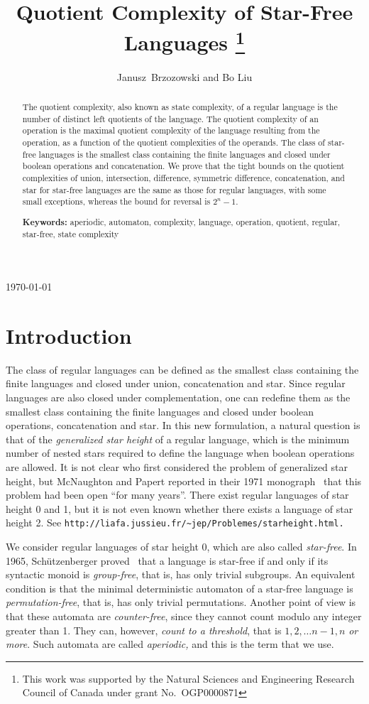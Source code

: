 \documentclass{llncs}
\title{Quotient Complexity of Star-Free Languages
\thanks{This work was supported by the Natural Sciences and Engineering Research Council of Canada under grant No.~OGP0000871
}
}
\author{Janusz~Brzozowski and Bo Liu
 }
\institute{David R. Cheriton School of Computer Science, University of Waterloo, \\
Waterloo, ON, Canada N2L 3G1\\
\{ {\tt brzozo, b23liu} \}{\tt @uwaterloo.ca} 
}
\newcommand{\noin}{\noindent}
\begin{document}
\maketitle
\today
\begin{abstract}
The quotient complexity, also known as state complexity, of a regular language is the number of distinct left quotients of the language.
The quotient complexity of an operation is the maximal quotient complexity of the language resulting from the operation, as a function of the quotient complexities of the operands.
The class of star-free languages is the smallest class  containing the  finite languages and closed under boolean operations and concatenation.
We prove that the tight bounds on the quotient complexities of union, intersection, difference,  symmetric difference, concatenation, and star  for star-free languages are the same as those for regular languages, with some small exceptions, whereas the bound for reversal is $2^n-1$.
\bigskip

\noin
{\bf Keywords:}
aperiodic, automaton,  complexity,  language,  operation, quotient, regular, star-free, state complexity
\end{abstract}


\section{Introduction}

The class of regular languages can be defined as the smallest class containing the finite languages and closed under union, concatenation and star. Since regular languages are also closed under complementation, one can redefine them as the smallest class containing the finite languages and closed under boolean operations, concatenation and star. In this new formulation, a natural question is that of the \emph{generalized star height} of a regular language, which is the minimum number of nested stars required to define the language when boolean operations are allowed. 
It is not clear who first considered the problem of generalized star height, but McNaughton and Papert reported in their 1971 monograph~\cite{McPa71} that this problem had been open ``for many years''.
There exist regular languages of star height 0 and 1, but it is not even known whether there exists a language of star height 2. See 
{\small\tt http://liafa.jussieu.fr/\~{}jep/Problemes/starheight.html.}



We consider regular languages of star height 0, which are also called \emph{star-free}. 
In 1965, Sch\"utzenberger proved~\cite{Sch65} that a language is star-free if and only if its syntactic monoid is \emph{group-free}, that is, has only trivial subgroups. An equivalent condition is that the minimal deterministic automaton of a star-free language is \emph{permutation-free}, that is, has only trivial permutations. Another point of view is that these automata are \emph{counter-free}, since they cannot count modulo any integer greater than 1. They can, however, \emph{count to a threshold}, that is $1, 2, \ldots n-1, n$ \emph{or more}.
Such automata are called \emph{aperiodic,} and this is the term that we use.
\end{document}
